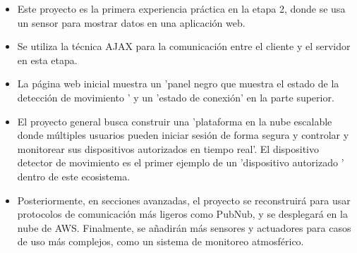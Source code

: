 \documentclass{report}
\begin{document}
\begin{itemize}
    \begin{itemize}
        \item Este proyecto es la primera experiencia práctica en la etapa 2, donde se usa un sensor para mostrar datos en una aplicación web.
        \item Se utiliza la técnica AJAX para la comunicación entre el cliente y el servidor en esta etapa.
        \item La página web inicial muestra un  'panel negro que muestra el estado de la detección de movimiento ' y un  'estado de conexión' en la 
        parte superior.
        \item El proyecto general busca construir una  'plataforma en la nube escalable donde múltiples usuarios pueden iniciar sesión de forma segura y 
        controlar y monitorear sus dispositivos autorizados en tiempo real'. El dispositivo detector de movimiento es el primer ejemplo de un  'dispositivo autorizado ' 
        dentro de este ecosistema.
        \item Posteriormente, en secciones avanzadas, el proyecto se reconstruirá para usar protocolos de comunicación más ligeros como PubNub, y se desplegará 
        en la nube de AWS. Finalmente, se añadirán más sensores y actuadores para casos de uso más complejos, como un sistema de monitoreo atmosférico.
    \end{itemize}

\end{itemize}
\end{document}
